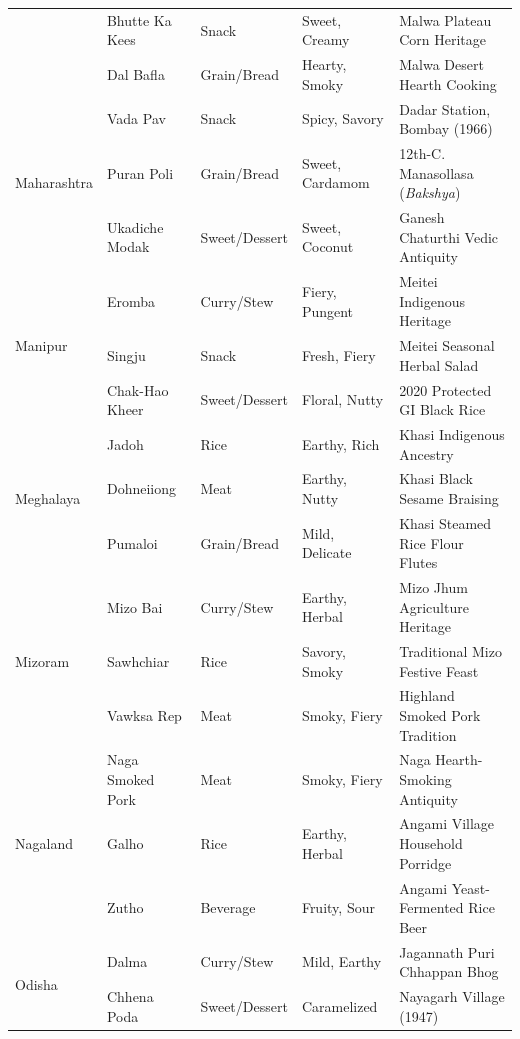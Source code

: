 \documentclass[11pt,a4paper]{report}
\begin{document}
\begin{small}
\begin{longtable}{llllp{4.2cm}}
        & Bhutte Ka Kees & Snack & Sweet, Creamy & Malwa Plateau Corn Heritage \\
        & Dal Bafla & Grain/Bread & Hearty, Smoky & Malwa Desert Hearth Cooking \\
    \midrule
    \multirow{3}{*}{Maharashtra}
        & Vada Pav & Snack & Spicy, Savory & Dadar Station, Bombay (1966) \\
        & Puran Poli & Grain/Bread & Sweet, Cardamom & 12th-C. Manasollasa (\emph{Bakshya}) \\
        & Ukadiche Modak & Sweet/Dessert & Sweet, Coconut & Ganesh Chaturthi Vedic Antiquity \\
    \midrule
    \multirow{3}{*}{Manipur}
        & Eromba & Curry/Stew & Fiery, Pungent & Meitei Indigenous Heritage \\
        & Singju & Snack & Fresh, Fiery & Meitei Seasonal Herbal Salad \\
        & Chak-Hao Kheer & Sweet/Dessert & Floral, Nutty & 2020 Protected GI Black Rice \\
    \midrule
    \multirow{3}{*}{Meghalaya}
        & Jadoh & Rice & Earthy, Rich & Khasi Indigenous Ancestry \\
        & Dohneiiong & Meat & Earthy, Nutty & Khasi Black Sesame Braising \\
        & Pumaloi & Grain/Bread & Mild, Delicate & Khasi Steamed Rice Flour Flutes \\
    \midrule
    \multirow{3}{*}{Mizoram}
        & Mizo Bai & Curry/Stew & Earthy, Herbal & Mizo Jhum Agriculture Heritage \\
        & Sawhchiar & Rice & Savory, Smoky & Traditional Mizo Festive Feast \\
        & Vawksa Rep & Meat & Smoky, Fiery & Highland Smoked Pork Tradition \\
    \midrule
    \multirow{3}{*}{Nagaland}
        & Naga Smoked Pork & Meat & Smoky, Fiery & Naga Hearth-Smoking Antiquity \\
        & Galho & Rice & Earthy, Herbal & Angami Village Household Porridge \\
        & Zutho & Beverage & Fruity, Sour & Angami Yeast-Fermented Rice Beer \\
    \midrule
    \multirow{3}{*}{Odisha}
        & Dalma & Curry/Stew & Mild, Earthy & Jagannath Puri Chhappan Bhog \\
        & Chhena Poda & Sweet/Dessert & Caramelized & Nayagarh Village (1947) \\

\end{longtable}
\end{small}
\end{document}
